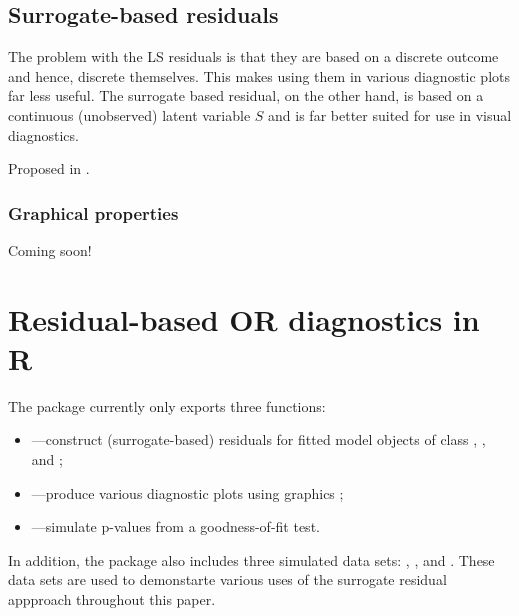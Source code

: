 \subsection{Surrogate-based residuals}

The problem with the LS residuals is that they are based on a discrete outcome and hence, discrete themselves. This makes using them in various diagnostic plots far less useful. The surrogate based residual, on the other hand, is based on a continuous (unobserved) latent variable $S$ and is far better suited for use in visual diagnostics.

Proposed in \citet{residuals-liu-2017}.


\subsubsection{Graphical properties}

Coming soon!



\section{Residual-based OR diagnostics in R}

The  package currently only exports three functions:
\begin{itemize}
  \item {}---construct (surrogate-based) residuals for fitted model objects of class , , and ;
  \item {}---produce various diagnostic plots using  graphics \citep{pkg-ggplot2};
 \item {}---simulate p-values from a goodness-of-fit test.
\end{itemize}
In addition, the package also includes three simulated data sets: , , and . These data sets are used to demonstarte various uses of the surrogate residual appproach throughout this paper.

